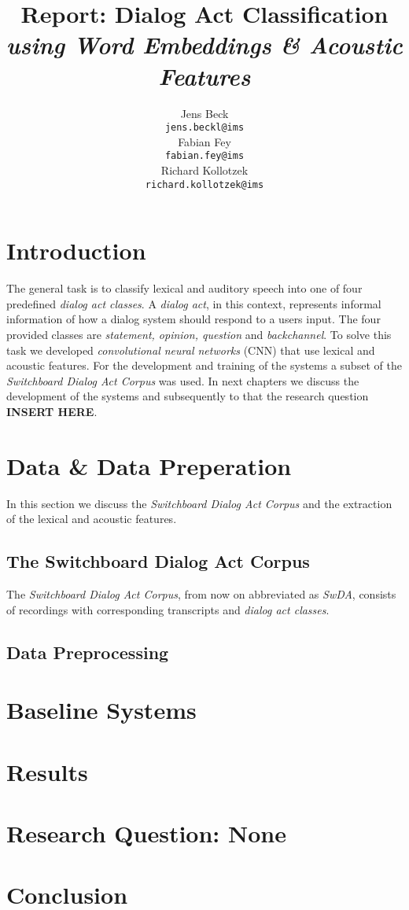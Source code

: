 \documentclass[11pt,a4paper]{article}
\title{Report: Dialog Act Classification\\\textit{using Word Embeddings \& Acoustic Features}}
\author{Jens Beck \\
  {\tt jens.beckl@ims} \\\And
  Fabian Fey \\
  {\tt fabian.fey@ims} \\\And
  Richard Kollotzek \\
  {\tt richard.kollotzek@ims} \\}
\date{}
\begin{document}
\maketitle

\begin{abstract}

\end{abstract}

\section{Introduction}
The general task is to classify lexical and auditory speech into one of four predefined \textit{dialog act classes}. A \textit{dialog act}, in this context, represents informal information of how a dialog system should respond to a users input. The four provided classes are \textit{statement, opinion, question} and \textit{backchannel}. To solve this task we developed \textit{convolutional neural networks} (CNN) that use lexical and acoustic features. For the development and training of the systems a subset of the \textit{Switchboard Dialog Act Corpus} was used. In next chapters we discuss the development of the systems and subsequently to that the research question \textbf{INSERT HERE}.

\section{Data \& Data Preperation}
In this section we discuss the \textit{Switchboard Dialog Act Corpus} and the extraction of the lexical and acoustic features.

	\subsection{The Switchboard Dialog Act Corpus}
	The \textit{Switchboard Dialog Act Corpus}, from now on abbreviated as \textit{SwDA}, consists of recordings with corresponding transcripts and \textit{dialog act classes}. 

	\subsection{Data Preprocessing}

\section{Baseline Systems}

\section{Results}

\section{Research Question: None}

\section{Conclusion}



\nocite{*}
\end{document}

